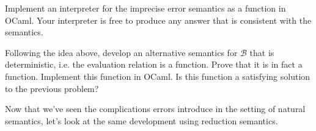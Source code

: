 \documentclass[11pt]{article}
\newcommand\Barith{\mathcal{B}}
\begin{document}
\begin{exercise}
Implement an interpreter for the imprecise error semantics as a
function in OCaml.  Your interpreter is free to produce any answer
that is consistent with the semantics.
\end{exercise}

\begin{exercise}\label{ex:determ}
Following the idea above, develop an alternative semantics for
$\Barith$ that is deterministic, i.e.  the evaluation relation is a
function.  Prove that it is in fact a function.  Implement this
function in OCaml.  Is this function a satisfying solution to the
previous problem?
\end{exercise}


Now that we've seen the complications errors introduce in the setting
of natural semantics, let's look at the same development using
reduction semantics.
\end{document}
